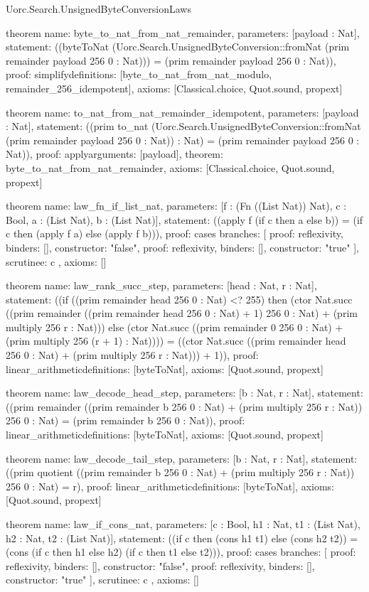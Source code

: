 \begin{lexlean}{Uorc.Search.UnsignedByteConversionLaws}
\begin{semanticmodule}
theorem{
  name: byte_to_nat_from_nat_remainder,
  parameters: [payload : Nat],
  statement: ((byteToNat (Uorc.Search.UnsignedByteConversion::fromNat (prim remainder payload 256 0 : Nat))) = (prim remainder payload 256 0 : Nat)),
  proof: simplify{definitions: [byte_to_nat_from_nat_modulo, remainder_256_idempotent]},
  axioms: [Classical.choice, Quot.sound, propext]
}

theorem{
  name: to_nat_from_nat_remainder_idempotent,
  parameters: [payload : Nat],
  statement: ((prim to_nat (Uorc.Search.UnsignedByteConversion::fromNat (prim remainder payload 256 0 : Nat)) : Nat) = (prim remainder payload 256 0 : Nat)),
  proof: apply{arguments: [payload], theorem: byte_to_nat_from_nat_remainder},
  axioms: [Classical.choice, Quot.sound, propext]
}

theorem{
  name: law_fn_if_list_nat,
  parameters: [f : (Fn ((List Nat)) Nat), c : Bool, a : (List Nat), b : (List Nat)],
  statement: ((apply f (if c then a else b)) = (if c then (apply f a) else (apply f b))),
  proof: cases{
    branches: [
      {proof: reflexivity{}, binders: [], constructor: "false"},
      {proof: reflexivity{}, binders: [], constructor: "true"}
    ],
    scrutinee: c
  },
  axioms: []
}

theorem{
  name: law_rank_succ_step,
  parameters: [head : Nat, r : Nat],
  statement: ((if ((prim remainder head 256 0 : Nat) <? 255) then (ctor Nat.succ ((prim remainder ((prim remainder head 256 0 : Nat) + 1) 256 0 : Nat) + (prim multiply 256 r : Nat))) else (ctor Nat.succ ((prim remainder 0 256 0 : Nat) + (prim multiply 256 (r + 1) : Nat)))) = ((ctor Nat.succ ((prim remainder head 256 0 : Nat) + (prim multiply 256 r : Nat))) + 1)),
  proof: linear_arithmetic{definitions: [byteToNat]},
  axioms: [Quot.sound, propext]
}

theorem{
  name: law_decode_head_step,
  parameters: [b : Nat, r : Nat],
  statement: ((prim remainder ((prim remainder b 256 0 : Nat) + (prim multiply 256 r : Nat)) 256 0 : Nat) = (prim remainder b 256 0 : Nat)),
  proof: linear_arithmetic{definitions: [byteToNat]},
  axioms: [Quot.sound, propext]
}

theorem{
  name: law_decode_tail_step,
  parameters: [b : Nat, r : Nat],
  statement: ((prim quotient ((prim remainder b 256 0 : Nat) + (prim multiply 256 r : Nat)) 256 0 : Nat) = r),
  proof: linear_arithmetic{definitions: [byteToNat]},
  axioms: [Quot.sound, propext]
}

theorem{
  name: law_if_cons_nat,
  parameters: [c : Bool, h1 : Nat, t1 : (List Nat), h2 : Nat, t2 : (List Nat)],
  statement: ((if c then (cons h1 t1) else (cons h2 t2)) = (cons (if c then h1 else h2) (if c then t1 else t2))),
  proof: cases{
    branches: [
      {proof: reflexivity{}, binders: [], constructor: "false"},
      {proof: reflexivity{}, binders: [], constructor: "true"}
    ],
    scrutinee: c
  },
  axioms: []
}


\end{semanticmodule}
\end{lexlean}
